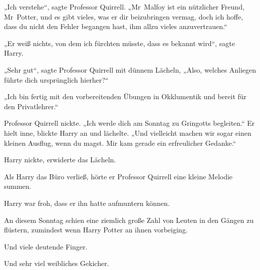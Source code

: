 „Ich verstehe“, sagte Professor Quirrell.
„Mr~Malfoy ist ein nützlicher Freund, Mr~Potter, und es gibt vieles, was er dir beizubringen vermag, doch ich hoffe, dass du nicht den Fehler begangen hast, ihm allzu vieles anzuvertrauen.“

„Er weiß nichts, von dem ich fürchten müsste, dass es bekannt wird“, sagte Harry.

„Sehr gut“, sagte Professor Quirrell mit dünnem Lächeln,
„Also, welches Anliegen führte dich ursprünglich hierher?“

„Ich bin fertig mit den vorbereitenden Übungen in Okklumentik und bereit für den Privatlehrer.“

Professor Quirrell nickte.
„Ich werde dich am Sonntag zu Gringotts begleiten.“ Er hielt inne, blickte Harry an und lächelte.
„Und vielleicht machen wir sogar einen kleinen Ausflug, wenn du magst. Mir kam gerade ein erfreulicher Gedanke.“

Harry nickte, erwiderte das Lächeln.

Als Harry das Büro verließ, hörte er Professor Quirrell eine kleine Melodie summen.

Harry war froh, dass er ihn hatte aufmuntern können.

\later

An diesem Sonntag schien eine ziemlich große Zahl von Leuten in den Gängen zu flüstern, zumindest wenn Harry Potter an ihnen vorbeiging.

Und viele deutende Finger.

Und sehr viel weibliches Gekicher.


